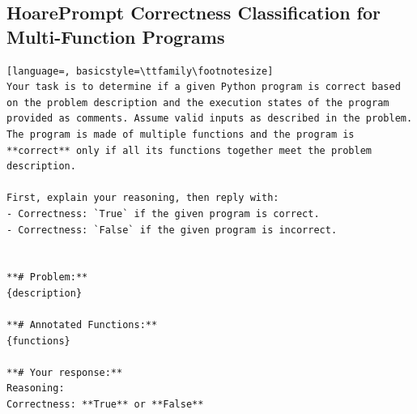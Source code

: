 \documentclass[sigconf]{acmart}
\begin{document}
\subsection{HoarePrompt Correctness Classification for Multi-Function Programs}
\label{correctness-multi-func-prompt}
\begin{tcolorbox}[ colback=gray!10, colframe=black, arc=5pt]
\begin{lstlisting}[language=, basicstyle=\ttfamily\footnotesize]
Your task is to determine if a given Python program is correct based on the problem description and the execution states of the program provided as comments. Assume valid inputs as described in the problem. The program is made of multiple functions and the program is **correct** only if all its functions together meet the problem description.

First, explain your reasoning, then reply with:  
- Correctness: `True` if the given program is correct.  
- Correctness: `False` if the given program is incorrect.


**# Problem:**  
{description}

**# Annotated Functions:**  
{functions}

**# Your response:**  
Reasoning:  
Correctness: **True** or **False**

\end{lstlisting}
\end{tcolorbox}
\flushbottom
\end{document}
